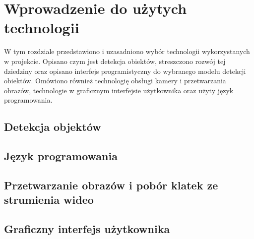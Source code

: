 \chapter{Wprowadzenie do użytych technologii}
\label{chap:technologie}
W tym rozdziale przedstawiono i uzasadniono wybór technologii wykorzystanych w projekcie. Opisano czym jest detekcja obiektów, streszczono rozwój tej dziedziny oraz opisano interfejs programistyczny do wybranego modelu detekcji obiektów. 
Omówiono również technologię obsługi kamery i przetwarzania obrazów, technologie w graficznym interfejsie użytkownika oraz użyty język programowania.  

\section{Detekcja objektów}


\section{Język programowania}


\section{Przetwarzanie obrazów i pobór klatek ze strumienia wideo}


\section{Graficzny interfejs użytkownika}
